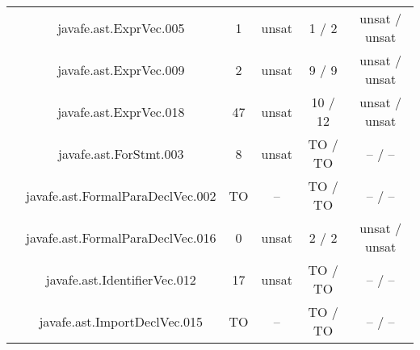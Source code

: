 \begin{table}[htbp]
\begin{minipage}{0.60\textwidth}
{\begin{tabular}[c]{c c!{\vrule width 1.5pt}c|c!{\vrule width 1.5pt}c|c|}
		 	& javafe.ast.ExprVec.005	    			     & 1    & unsat   & 1   / 2        & unsat / unsat     \\
		 	& javafe.ast.ExprVec.009 	    			     & 2    & unsat   & 9   / 9        & unsat / unsat     \\
		 	& javafe.ast.ExprVec.018	   			     & 47   & unsat   & 10  / 12       & unsat / unsat     \\
		 	& javafe.ast.ForStmt.003	    			     & 8    & unsat   & TO  / TO       & --    / --        \\
		 	& javafe.ast.FormalParaDeclVec.002			     & TO   & --      & TO  / TO       & --    / --        \\
		 	& javafe.ast.FormalParaDeclVec.016		             & 0    & unsat   & 2   / 2        & unsat / unsat     \\
		 	& javafe.ast.IdentifierVec.012    			     & 17   & unsat   & TO  / TO       & --    / --        \\
		 	& javafe.ast.ImportDeclVec.015	    			     & TO   & --      & TO  / TO       & --    / --        \\

\end{tabular}}
\end{minipage}
\end{table}
